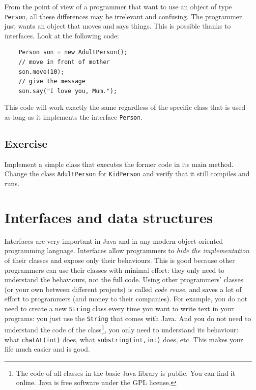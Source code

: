 From the point of view of a programmer that want to use an object of
type \verb+Person+, all these differences may be irrelevant and
confusing. The programmer just wants an object that moves and says
things. This is possible thanks to interfaces. Look at the following
code: 

\begin{verbatim}
    Person son = new AdultPerson();
    // move in front of mother
    son.move(10);
    // give the message
    son.say("I love you, Mum.");
\end{verbatim}

This code will work exactly the same regardless of the specific class
that is used as long as it
implements the interface \verb+Person+. 

\subsection*{Exercise}
\label{sec:exercise}

Implement a simple class that executes the former code in its main
method. Change the class \verb+AdultPerson+ for \verb+KidPerson+ and
verify that it still compiles and runs. 

\section{Interfaces and data structures}
\label{sec:interfaces-lists}

Interfaces are very important in Java and in any modern
object-oriented programming language. Interfaces allow programmers to
\emph{hide the implementation} of their classes and expose only their
behaviours. This is good because other programmers can use their
classes with minimal effort: they only need to understand the
behaviours, not the full code. Using other programmers' classes (or
your own between different projects) is called \emph{code reuse}, and
saves a lot of effort to programmers (and money to their
companies). For example, you do not need to 
create a new \verb+String+ class every
time you want to write text in your programs: you just use the
\verb+String+ that comes with Java. And you do not need to understand
the code of the class\footnote{The code of all classes in the basic
  Java library is public. You can find it online. Java is free
  software under the GPL license.}, you only need to understand its
behaviour: what \verb+chatAt(int)+ does, what
\verb+substring(int,int)+ does, etc. This makes your life much easier
and is good. 


